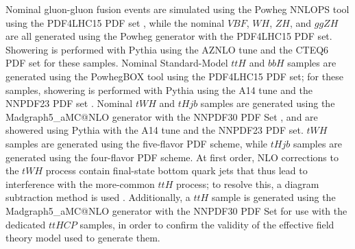 \begin{table}[h!]
  \centering
  \caption{Summary of nominal signal samples}
  \label{tab:signal_samples_pyt}
\end{table}

Nominal gluon-gluon fusion events are simulated using the Powheg NNLOPS tool \cite{NNLOPS} using the PDF4LHC15 PDF set \cite{PDF4LHC}, while the nominal $VBF$, $WH$, $ZH$, and $ggZH$ are all generated using the Powheg generator with the PDF4LHC15 PDF set. Showering is performed with Pythia using the AZNLO tune \cite{AZNLO} and the CTEQ6 PDF set \cite{CTEQ6} for these samples. Nominal Standard-Model $ttH$ and $bbH$ samples are generated using the PowhegBOX tool \cite{PowhegBox} using the PDF4LHC15 PDF set; for these samples, showering is performed with Pythia using the A14 tune \cite{A14} and the NNPDF23 PDF set \cite{NNPDF23}. Nominal $tWH$ and $tHjb$ samples are generated using the {Madgraph5\_aMC@NLO} generator with the NNPDF30 PDF Set \cite{NNPDF30}, and are showered using Pythia with the A14 tune and the NNPDF23 PDF set. $tWH$ samples are generated using the five-flavor PDF scheme, while $tHjb$ samples are generated using the four-flavor PDF scheme. At first order, NLO corrections to the $tWH$ process contain final-state bottom quark jets that thus lead to interference with the more-common $ttH$ process; to resolve this, a diagram subtraction method is used \cite{FedericotWH} \cite{subtraction}. Additionally, a $ttH$ sample is generated using the {Madgraph5\_aMC@NLO} generator with the NNPDF30 PDF Set \cite{NNPDF30} for use with the dedicated $ttH CP$ samples, in order to confirm the validity of the effective field theory model used to generate them.

